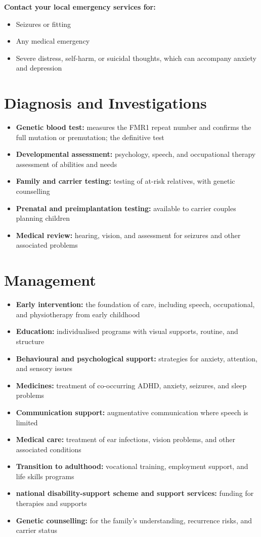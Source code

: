 \textbf{Contact your local emergency services for:}
\begin{itemize}
    \item Seizures or fitting
    \item Any medical emergency
    \item Severe distress, self-harm, or suicidal thoughts, which can accompany anxiety and depression
\end{itemize}

\section*{Diagnosis and Investigations}
\begin{itemize}
    \item \textbf{Genetic blood test:} measures the FMR1 repeat number and confirms the full mutation or premutation; the definitive test
    \item \textbf{Developmental assessment:} psychology, speech, and occupational therapy assessment of abilities and needs
    \item \textbf{Family and carrier testing:} testing of at-risk relatives, with genetic counselling
    \item \textbf{Prenatal and preimplantation testing:} available to carrier couples planning children
    \item \textbf{Medical review:} hearing, vision, and assessment for seizures and other associated problems
\end{itemize}

\section*{Management}
\begin{itemize}
    \item \textbf{Early intervention:} the foundation of care, including speech, occupational, and physiotherapy from early childhood
    \item \textbf{Education:} individualised programs with visual supports, routine, and structure
    \item \textbf{Behavioural and psychological support:} strategies for anxiety, attention, and sensory issues
    \item \textbf{Medicines:} treatment of co-occurring ADHD, anxiety, seizures, and sleep problems
    \item \textbf{Communication support:} augmentative communication where speech is limited
    \item \textbf{Medical care:} treatment of ear infections, vision problems, and other associated conditions
    \item \textbf{Transition to adulthood:} vocational training, employment support, and life skills programs
    \item \textbf{national disability-support scheme and support services:} funding for therapies and supports
    \item \textbf{Genetic counselling:} for the family's understanding, recurrence risks, and carrier status
\end{itemize}

